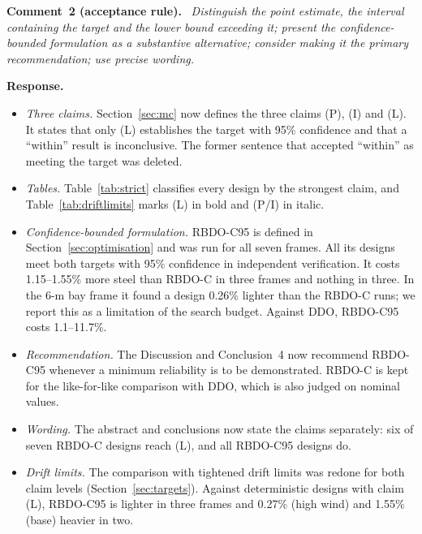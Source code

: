 \documentclass[11pt]{article}
\newenvironment{comment}[1]{\par\medskip\noindent\textbf{Comment~#1.}\ \itshape}{\par}
\newcommand{\resp}{\par\noindent\textbf{Response.}\ }
\begin{document}
\begin{comment}{2 (acceptance rule)}
Distinguish the point estimate, the interval containing the target and the lower bound exceeding it;
present the confidence-bounded formulation as a substantive alternative; consider making it the
primary recommendation; use precise wording.
\end{comment}
\resp
\begin{itemize}[itemsep=0.1em]
\item \emph{Three claims.} Section~\ref{sec:mc} now defines the three claims (P), (I) and (L). It
states that only (L) establishes the target with 95\% confidence and that a ``within'' result is
inconclusive. The former sentence that accepted ``within'' as meeting the target was deleted.
\item \emph{Tables.} Table~\ref{tab:strict} classifies every design by the strongest claim, and
Table~\ref{tab:driftlimits} marks (L) in bold and (P/I) in italic.
\item \emph{Confidence-bounded formulation.} RBDO-C95 is defined in Section~\ref{sec:optimisation}
and was run for all seven frames. All its designs meet both targets with 95\% confidence in
independent verification. It costs 1.15--1.55\% more steel than RBDO-C in three frames and nothing in
three. In the 6-m bay frame it found a design 0.26\% lighter than the RBDO-C runs; we report this as
a limitation of the search budget. Against DDO, RBDO-C95 costs 1.1--11.7\%.
\item \emph{Recommendation.} The Discussion and Conclusion~4 now recommend RBDO-C95 whenever a
minimum reliability is to be demonstrated. RBDO-C is kept for the like-for-like comparison with
DDO, which is also judged on nominal values.
\item \emph{Wording.} The abstract and conclusions now state the claims separately: six of seven
RBDO-C designs reach (L), and all RBDO-C95 designs do.
\item \emph{Drift limits.} The comparison with tightened drift limits was redone for both claim levels
(Section~\ref{sec:targets}). Against deterministic designs with claim (L), RBDO-C95 is lighter in
three frames and 0.27\% (high wind) and 1.55\% (base) heavier in two.
\end{itemize}
\end{document}
